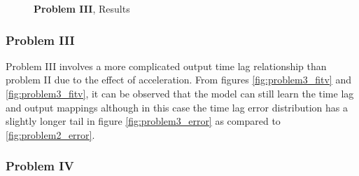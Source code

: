 \documentclass[envcountsect,runningheads]{llncs}
\theoremstyle{etoile}
\begin{document}
\begin{figure}
  
  
  \caption{\textbf{Problem III}, Results}
\end{figure}


\subsubsection{Problem III}

Problem III involves a more complicated output time lag relationship than problem II due to the 
effect of acceleration. From figures \ref{fig:problem3_fitv} and \ref{fig:problem3_fitv}, 
it can be observed that the model can still learn the time lag and output mappings although 
in this case the time lag error distribution has a slightly longer tail in figure 
\ref{fig:problem3_error} as compared to \ref{fig:problem2_error}.





\subsubsection{Problem IV}
\end{document}
